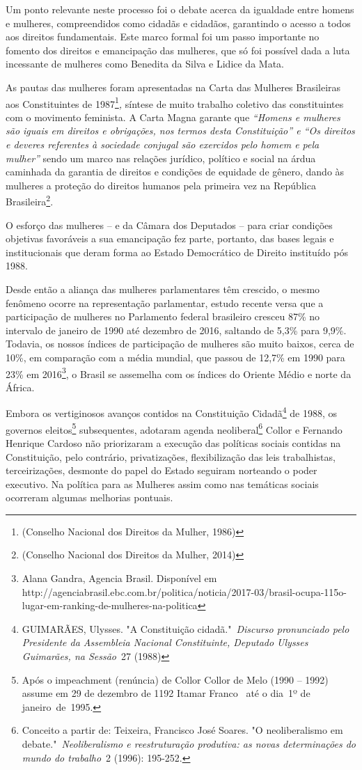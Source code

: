 Um ponto relevante neste processo foi o debate acerca da igualdade entre
homens e mulheres, compreendidos como cidadãs e cidadãos, garantindo o
acesso a todos aos direitos fundamentais. Este marco formal foi um passo
importante no fomento dos direitos e emancipação das mulheres, que só
foi possível dada a luta incessante de mulheres como Benedita da Silva e
Lidice da Mata.

As pautas das mulheres foram apresentadas na Carta das Mulheres
Brasileiras aos Constituintes de 1987\footnote{(Conselho Nacional dos
  Direitos da Mulher, 1986)}\emph{,} síntese de muito trabalho coletivo
das constituintes com o movimento feminista. A Carta Magna garante que
\emph{``Homens e mulheres são iguais em direitos e obrigações, nos
termos desta Constituição'' e ``Os direitos e deveres referentes à
sociedade conjugal são exercidos pelo homem e pela mulher''} sendo um
marco nas relações jurídico, político e social na árdua caminhada da
garantia de direitos e condições de equidade de gênero, dando às
mulheres a proteção do direitos humanos pela primeira vez na República
Brasileira\footnote{(Conselho Nacional dos Direitos da Mulher, 2014)}.

O esforço das mulheres -- e da Câmara dos Deputados -- para criar
condições objetivas favoráveis a sua emancipação fez parte, portanto,
das bases legais e institucionais que deram forma ao Estado Democrático
de Direito instituído pós 1988.

Desde então a aliança das mulheres parlamentares têm crescido, o mesmo
fenômeno ocorre na representação parlamentar, estudo recente versa que a
participação de mulheres no Parlamento federal brasileiro cresceu 87\%
no intervalo de janeiro de 1990 até dezembro de 2016, saltando de 5,3\%
para 9,9\%. Todavia, os nossos índices de participação de mulheres são
muito baixos, cerca de 10\%, em comparação com a média mundial, que
passou de 12,7\% em 1990 para 23\% em 2016\footnote{Alana Gandra,
  Agencia Brasil. Disponível em
  http://agenciabrasil.ebc.com.br/politica/noticia/2017-03/brasil-ocupa-115o-lugar-em-ranking-de-mulheres-na-politica},
o Brasil se assemelha com os índices do Oriente Médio e norte da África.

Embora os vertiginosos avanços contidos na Constituição Cidadã\footnote{GUIMARÃES,
  Ulysses. "A Constituição cidadã."~\emph{Discurso pronunciado pelo
  Presidente da Assembleia Nacional Constituinte, Deputado Ulysses
  Guimarães, na Sessão}~27 (1988)} de 1988, os governos
eleitos\footnote{Após o impeachment (renúncia) de Collor Collor de Melo
  (1990 -- 1992) assume em 29 de dezembro de 1192 Itamar Franco~ até o
  dia~1º de janeiro~de~1995.}
subsequentes, adotaram agenda neoliberal\footnote{Conceito a partir de:
  Teixeira, Francisco José Soares. "O neoliberalismo em
  debate."~\emph{Neoliberalismo e reestruturação produtiva: as novas
  determinações do mundo do trabalho}~2 (1996): 195-252.} Collor e
Fernando Henrique Cardoso não priorizaram a execução das políticas
sociais contidas na Constituição, pelo contrário, privatizações,
flexibilização das leis trabalhistas, terceirizações, desmonte do papel
do Estado seguiram norteando o poder executivo. Na política para as
Mulheres assim como nas temáticas sociais ocorreram algumas melhorias
pontuais.

